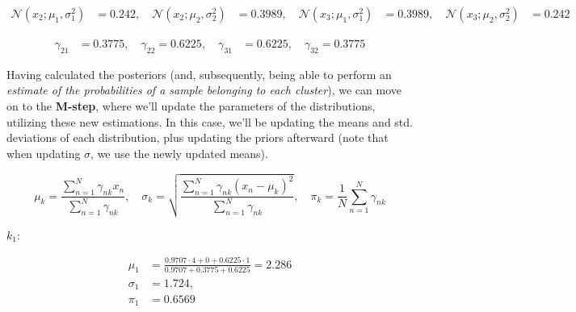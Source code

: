 \documentclass[12pt]{article}
\begin{document}
\begin{enumerate}[leftmargin=\labelsep]
  \begin{equation*}
    \begin{aligned}
      \mathcal{N} (x_2; \mu_1, \sigma_1^2) & = 0.242, \quad
      \mathcal{N} (x_2; \mu_2, \sigma_2^2) & = 0.3989, \quad
      \mathcal{N} (x_3; \mu_1, \sigma_1^2) & = 0.3989, \quad
      \mathcal{N} (x_3; \mu_2, \sigma_2^2) & = 0.242
    \end{aligned}
  \end{equation*}

  \begin{equation*}
    \begin{aligned}
      \gamma_{21} & = 0.3775, \quad
      \gamma_{22} = 0.6225, \quad
      \gamma_{31} & = 0.6225, \quad
      \gamma_{32} = 0.3775
    \end{aligned}
  \end{equation*}

  Having calculated the posteriors (and, subsequently, being able to perform an \textit{estimate
    of the probabilities of a sample belonging to each cluster}), we can move on to the
  \textbf{M-step}, where we'll update the parameters of the distributions, utilizing these
  new estimations. In this case, we'll be updating the means and std. deviations of each
  distribution, plus updating the priors afterward (note that when updating $\sigma$,
  we use the newly updated means).

  \begin{equation*}
    \mu_k = \frac{\sum_{n = 1}^N \gamma_{nk} x_n}{\sum_{n = 1}^N \gamma_{nk}}, \quad
    \sigma_k = \sqrt{\frac{\sum_{n = 1}^N \gamma_{nk} (x_n - \mu_k)^2}{\sum_{n = 1}^N \gamma_{nk}}}, \quad
    \pi_k = \frac{1}{N} \sum_{n = 1}^N \gamma_{nk}
  \end{equation*}

  \begin{paracol}{2}
    \setlength{\columnseprule}{1pt}
    \def\columnseprulecolor{\color{black}}
    \centering

    $k_1$:

    \begin{equation*}
      \begin{aligned}
        \mu_1    & = \frac{0.9707 \cdot 4 + 0 + 0.6225 \cdot 1}{0.9707 + 0.3775 + 0.6225} = 2.286 \\
        \sigma_1 & = 1.724,                                                                       \\
        \pi_1    & = 0.6569
      \end{aligned}
    \end{equation*}


\end{paracol}
\end{enumerate}
\end{document}

